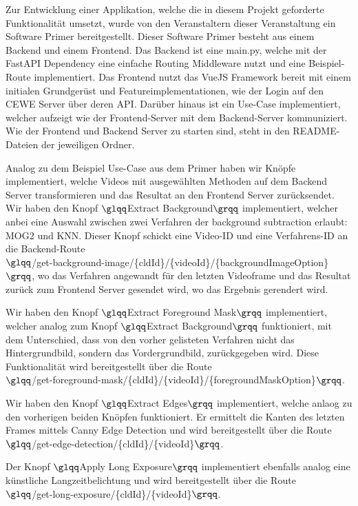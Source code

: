 \documentclass[12pt]{scrartcl}
\begin{document}
Zur Entwicklung einer Applikation, welche die in diesem Projekt geforderte Funktionalit\"at umsetzt, wurde von den Veranstaltern dieser Veranstaltung ein Software Primer bereitgestellt. Dieser Software Primer besteht aus einem Backend und einem Frontend. Das Backend ist eine main.py, welche mit der FastAPI Dependency eine einfache Routing Middleware nutzt und  eine Beispiel-Route implementiert. Das Frontend nutzt das VueJS Framework bereit mit einem initialen Grundger\"ust und Featureimplementationen, wie der Login auf den CEWE Server \"uber deren API. Dar\"uber hinaus ist ein Use-Case implementiert, welcher aufzeigt wie der Frontend-Server mit dem Backend-Server kommuniziert. Wie der Frontend und Backend Server zu starten sind, steht in den README-Dateien der jeweiligen Ordner.

Analog zu dem Beispiel Use-Case aus dem Primer haben wir Kn\"opfe implementiert, welche Videos mit ausgew\"ahlten Methoden auf dem Backend Server transformieren und das Resultat an den Frontend Server zur\"ucksendet. Wir haben den Knopf $\glqq$Extract Background$\grqq$ implementiert, welcher anbei eine Auswahl zwischen zwei Verfahren der background subtraction erlaubt: MOG2 und KNN. Dieser Knopf schickt eine Video-ID und eine Verfahrens-ID an die Backend-Route\\
$\glqq$/get-background-image/\{cldId\}/\{videoId\}/\{backgroundImageOption\}$\grqq$, wo das Verfahren angewandt f\"ur den letzten Videoframe und das Resultat zur\"uck zum Frontend Server gesendet wird, wo das Ergebnis gerendert wird.

Wir haben den Knopf $\glqq$Extract Foreground Mask$\grqq$ implementiert, welcher analog zum Knopf $\glqq$Extract Background$\grqq$ funktioniert, mit dem Unterschied, dass von den vorher gelisteten Verfahren nicht das Hintergrundbild, sondern das Vordergrundbild, zur\"uckgegeben wird. Diese Funktionalit\"at wird bereitgestellt \"uber die Route\\
$\glqq$/get-foreground-mask/\{cldId\}/\{videoId\}/\{foregroundMaskOption\}$\grqq$.

Wir haben den Knopf $\glqq$Extract Edges$\grqq$ implementiert, welche anlaog zu den vorherigen beiden Kn\"opfen funktioniert. Er ermittelt die Kanten des letzten Frames mittels Canny Edge Detection und wird bereitgestellt \"uber die Route\\
$\glqq$/get-edge-detection/\{cldId\}/\{videoId\}$\grqq$.

Der Knopf $\glqq$Apply Long Exposure$\grqq$ implementiert ebenfalls analog eine k\"unstliche Langzeitbelichtung und wird bereitgestellt \"uber die Route\\
$\glqq$/get-long-exposure/\{cldId\}/\{videoId\}$\grqq$.
\end{document}
